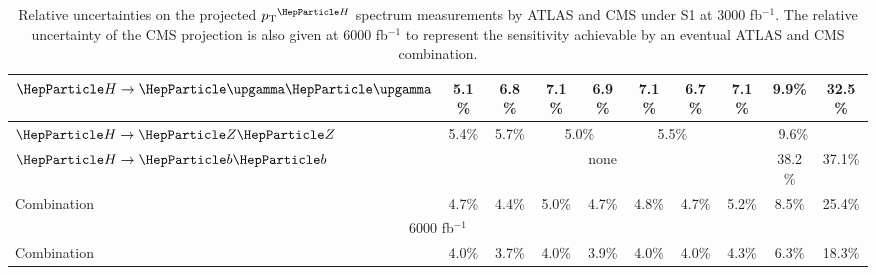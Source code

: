 \begin{table}[th]
{\begin{tabular}{l|cccccccc|c|c|c|c|c|c|c|c}
    \hline
    $\hgg$       & \multicolumn{4}{c|}{5.1\%} & \multicolumn{4}{c|}{6.8\%} & 7.1\%                      & \multicolumn{2}{c|}{6.9\%} & 7.1\%  & 6.7\%   & 7.1\%   & 9.9\%   & 32.5\%                                           \\     
    \hline
    $\hzz$       & \multicolumn{4}{c|}{5.4\%} & \multicolumn{4}{c|}{5.7\%} & \multicolumn{3}{c|}{5.0\%} & \multicolumn{2}{c|}{5.5\%} & \multicolumn{3}{c}{9.6\%}                                                               \\ 
    \hline
    $\hbb$       & \multicolumn{14}{c|}{none} & 38.2\%                     & 37.1\%                                                                                                                                            \\ 
    \hline
    Combination  & \multicolumn{4}{c|}{4.7\%} & \multicolumn{4}{c|}{4.4\%} & 5.0\%                      & \multicolumn{2}{c|}{4.7\%} & 4.8\%  & 4.7\%   & 5.2\%   & 8.5\%   & 25.4\%                                           \\
    \hline
    \hline
    \multicolumn{17}{c}{6000 fb$^{-1}$}                                                                                                                                                                                                   \\
    \hline
    \hline
    Combination  & \multicolumn{4}{c|}{4.0\%} & \multicolumn{4}{c|}{3.7\%} & 4.0\% & \multicolumn{2}{c|}{3.9\%} & 4.0\% & 4.0\% & 4.3\% & 6.3\% & 18.3\% \\
    \hline
    \hline
  \end{tabular}
  }
  \caption{Relative uncertainties on the projected $\pTH$ spectrum measurements by ATLAS and CMS under S1 at 3000 fb$^{-1}$.  The relative uncertainty of the CMS projection is also given at 6000 fb$^{-1}$ to represent the sensitivity achievable by an eventual ATLAS and CMS combination. }
  \label{tab:proj_pth_unc_scen1}
\end{table}


